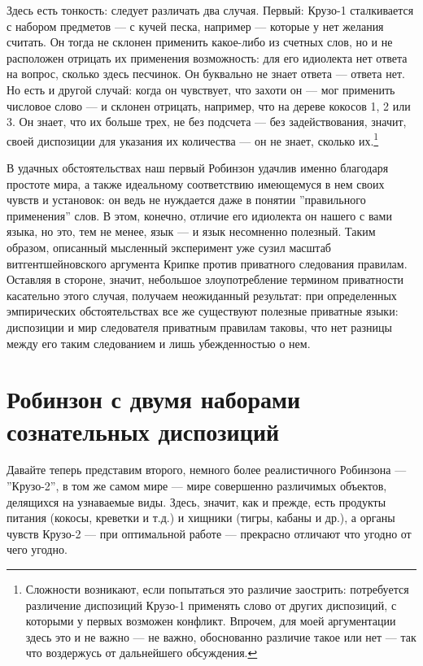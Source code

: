 \documentclass[11pt]{book}
\begin{document}
Здесь есть тонкость: следует различать два случая. Первый: Крузо-1 сталкивается с набором предметов --- с кучей песка, например --- которые у нет желания считать. Он тогда не склонен применить какое-либо из счетных слов, но и не расположен отрицать их применения возможность: для его идиолекта нет ответа на вопрос, сколько здесь песчинок. Он буквально не знает ответа --- ответа нет. Но есть и другой случай: когда он чувствует, что захоти он --- мог применить числовое слово --- и склонен отрицать, например, что на дереве кокосов 1, 2 или 3. Он знает, что их больше трех, не без подсчета --- без задействования, значит, своей диспозиции для указания их количества --- он не знает, сколько их.\footnote{Сложности возникают, если попытаться это различие заострить: потребуется различение диспозиций Крузо-1 применять слово от других диспозиций, с которыми у первых возможен конфликт. Впрочем, для моей аргументации здесь это и не важно --- не важно, обоснованно различие такое или нет --- так что воздержусь от дальнейшего обсуждения.}

В удачных обстоятельствах наш первый Робинзон удачлив именно благодаря простоте мира, а также идеальному соответствию имеющемуся в нем своих чувств и установок: он ведь не нуждается даже в понятии ''правильного применения'' слов. В этом, конечно, отличие его идиолекта он нашего с вами языка, но это, тем не менее, язык --- и язык несомненно полезный. Таким образом, описанный мысленный эксперимент уже сузил масштаб витгентшейновского аргумента Крипке против приватного следования правилам. Оставляя в стороне, значит, небольшое злоупотребление термином приватности касательно этого случая, получаем неожиданный результат: при определенных эмпирических обстоятельствах все же существуют полезные приватные языки: диспозиции и мир следователя приватным правилам таковы, что нет разницы между его таким следованием и лишь убежденностью о нем.

\section{Робинзон с двумя наборами сознательных диспозиций}

Давайте теперь представим второго, немного более реалистичного Робинзона --- ''Крузо-2'', в том же самом мире --- мире совершенно различимых объектов, делящихся на узнаваемые виды. Здесь, значит, как и прежде, есть продукты питания (кокосы, креветки и т.д.) и хищники (тигры, кабаны и др.), а органы чувств Крузо-2 --- при оптимальной работе --- прекрасно отличают что угодно от чего угодно.
\end{document}
